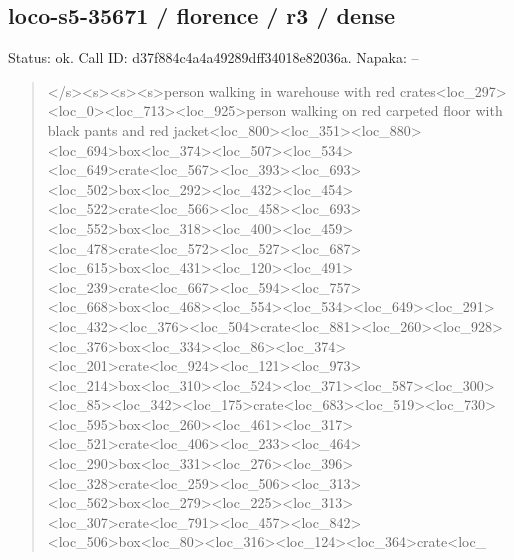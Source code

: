 \documentclass[10pt,a4paper]{article}
\begin{document}
\subsection*{loco-s5-35671 / florence / r3 / dense}
Status: ok. Call ID: d37f884c4a4a49289dff34018e82036a. Napaka: --
\begin{quote}\footnotesize
</s>\allowbreak{}<s>\allowbreak{}<s>\allowbreak{}<s>\allowbreak{}person walking in warehouse with red crates<loc\_297>\allowbreak{}<loc\_0>\allowbreak{}<loc\_713>\allowbreak{}<\allowbreak{}loc\_925>\allowbreak{}person walking on red carpeted floor with black pants and red jacket<loc\_800>\allowbreak{}<loc\_351>\allowbreak{}<loc\_880\allowbreak{}>\allowbreak{}<loc\_694>\allowbreak{}box<loc\_374>\allowbreak{}<loc\_507>\allowbreak{}<\allowbreak{}loc\_534>\allowbreak{}<loc\_649>\allowbreak{}crate<loc\_567>\allowbreak{}<\allowbreak{}loc\_393>\allowbreak{}<loc\_693>\allowbreak{}<loc\_502>\allowbreak{}box<lo\allowbreak{}c\_292>\allowbreak{}<loc\_432>\allowbreak{}<loc\_454>\allowbreak{}<loc\_522\allowbreak{}>\allowbreak{}crate<loc\_566>\allowbreak{}<loc\_458>\allowbreak{}<loc\_693\allowbreak{}>\allowbreak{}<loc\_552>\allowbreak{}box<loc\_318>\allowbreak{}<loc\_400>\allowbreak{}<\allowbreak{}loc\_459>\allowbreak{}<loc\_478>\allowbreak{}crate<loc\_572>\allowbreak{}<\allowbreak{}loc\_527>\allowbreak{}<loc\_687>\allowbreak{}<loc\_615>\allowbreak{}box<lo\allowbreak{}c\_431>\allowbreak{}<loc\_120>\allowbreak{}<loc\_491>\allowbreak{}<loc\_239\allowbreak{}>\allowbreak{}crate<loc\_667>\allowbreak{}<loc\_594>\allowbreak{}<loc\_757\allowbreak{}>\allowbreak{}<loc\_668>\allowbreak{}box<loc\_468>\allowbreak{}<loc\_554>\allowbreak{}<\allowbreak{}loc\_534>\allowbreak{}<loc\_649>\allowbreak{}<loc\_291>\allowbreak{}<loc\_4\allowbreak{}32>\allowbreak{}<loc\_376>\allowbreak{}<loc\_504>\allowbreak{}crate<loc\_8\allowbreak{}81>\allowbreak{}<loc\_260>\allowbreak{}<loc\_928>\allowbreak{}<loc\_376>\allowbreak{}bo\allowbreak{}x<loc\_334>\allowbreak{}<loc\_86>\allowbreak{}<loc\_374>\allowbreak{}<loc\_\allowbreak{}201>\allowbreak{}crate<loc\_924>\allowbreak{}<loc\_121>\allowbreak{}<loc\_\allowbreak{}973>\allowbreak{}<loc\_214>\allowbreak{}box<loc\_310>\allowbreak{}<loc\_52\allowbreak{}4>\allowbreak{}<loc\_371>\allowbreak{}<loc\_587>\allowbreak{}<loc\_300>\allowbreak{}<lo\allowbreak{}c\_85>\allowbreak{}<loc\_342>\allowbreak{}<loc\_175>\allowbreak{}crate<loc\allowbreak{}\_683>\allowbreak{}<loc\_519>\allowbreak{}<loc\_730>\allowbreak{}<loc\_595>\allowbreak{}\allowbreak{}box<loc\_260>\allowbreak{}<loc\_461>\allowbreak{}<loc\_317>\allowbreak{}<l\allowbreak{}oc\_521>\allowbreak{}crate<loc\_406>\allowbreak{}<loc\_233>\allowbreak{}<l\allowbreak{}oc\_464>\allowbreak{}<loc\_290>\allowbreak{}box<loc\_331>\allowbreak{}<loc\allowbreak{}\_276>\allowbreak{}<loc\_396>\allowbreak{}<loc\_328>\allowbreak{}crate<loc\allowbreak{}\_259>\allowbreak{}<loc\_506>\allowbreak{}<loc\_313>\allowbreak{}<loc\_562>\allowbreak{}\allowbreak{}box<loc\_279>\allowbreak{}<loc\_225>\allowbreak{}<loc\_313>\allowbreak{}<l\allowbreak{}oc\_307>\allowbreak{}crate<loc\_791>\allowbreak{}<loc\_457>\allowbreak{}<l\allowbreak{}oc\_842>\allowbreak{}<loc\_506>\allowbreak{}box<loc\_80>\allowbreak{}<loc\_\allowbreak{}316>\allowbreak{}<loc\_124>\allowbreak{}<loc\_364>\allowbreak{}crate<loc\_\allowbr
\end{quote}
\end{document}

